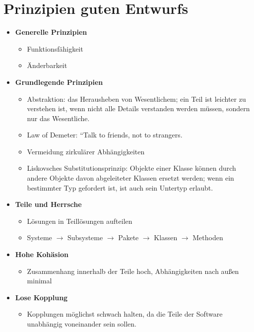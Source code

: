 \section{Prinzipien guten Entwurfs}

\begin{tcolorbox}[title=Prinzipien guten Entwurfs]

    \begin{itemize}
        \item \textbf{Generelle Prinzipien}
        \begin{itemize}
            \item Funktionsfähigkeit
            \item Änderbarkeit
        \end{itemize}
        \item \textbf{Grundlegende Prinzipien}
        \begin{itemize}
            \item Abstraktion:  das Herausheben von Wesentlichem;  ein Teil ist leichter zu verstehen ist, wenn nicht alle Details verstanden werden müssen, sondern nur das Wesentliche.
            \item Law of Demeter: ``Talk to friends, not to strangers.
            \item Vermeidung zirkulärer Abhängigkeiten
            \item Liskovsches Substitutionsprinzip: Objekte einer Klasse können durch andere Objekte davon abgeleiteter Klassen ersetzt werden; wenn ein bestimmter Typ gefordert ist, ist auch sein Untertyp erlaubt.
        \end{itemize}
        \item \textbf{Teile und Herrsche}
        \begin{itemize}
            \item Lösungen in Teillösungen aufteilen
            \item Systeme $\rightarrow$ Subsysteme $\rightarrow$ Pakete $\rightarrow$  Klassen $\rightarrow$ Methoden
        \end{itemize}
        \item \textbf{Hohe Kohäsion}
        \begin{itemize}
            \item Zusammenhang innerhalb der Teile hoch, Abhängigkeiten nach außen minimal
        \end{itemize}
        \item \textbf{Lose Kopplung}
        \begin{itemize}
            \item Kopplungen möglichst schwach halten, da die Teile der Software unabhängig voneinander sein sollen.
        \end{itemize}
    \end{itemize}

\end{tcolorbox}